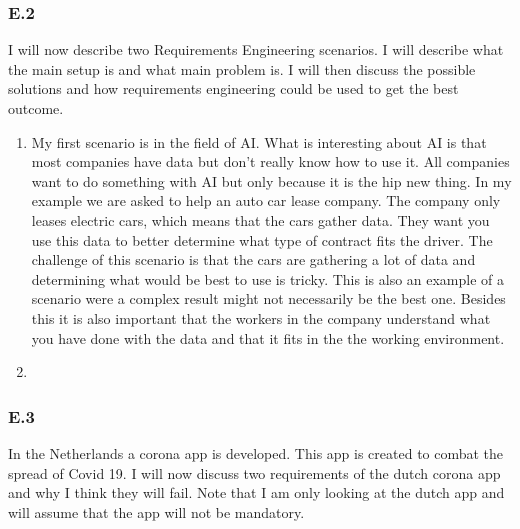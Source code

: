 \documentclass[]{article}
\begin{document}
\subsubsection*{E.2}
I will now describe two Requirements Engineering scenarios. I will describe what
the main setup is and what main problem is. I will then discuss the possible 
solutions and how requirements engineering could be used to get the best outcome.
\begin{enumerate}
    \item My first scenario is in the field of AI. What is interesting about AI 
    is that most companies have data but don't really know how to use it. All 
    companies want to do something with AI but only because it is the hip new 
    thing. In my example we are asked to help an auto car lease company. The 
    company only leases electric cars, which means that the cars gather data. 
    They want you use this data to better determine what type of contract fits 
    the driver. The challenge of this scenario is that the cars are gathering 
    a lot of data and determining what would be best to use is tricky. This is 
    also an example of a scenario were a complex result might not necessarily 
    be the best one.
    Besides this it is also important that the workers in the company understand 
    what you have done with the data and that it fits in the the working 
    environment. 
    \item 
\end{enumerate}

\subsubsection*{E.3}
In the Netherlands a corona app is developed. This app is created to combat the 
spread of Covid 19. I will now discuss two requirements of the dutch corona 
app and why I think they will fail. Note that I am only looking at the dutch
app and will assume that the app will not be mandatory. 
\end{document}
